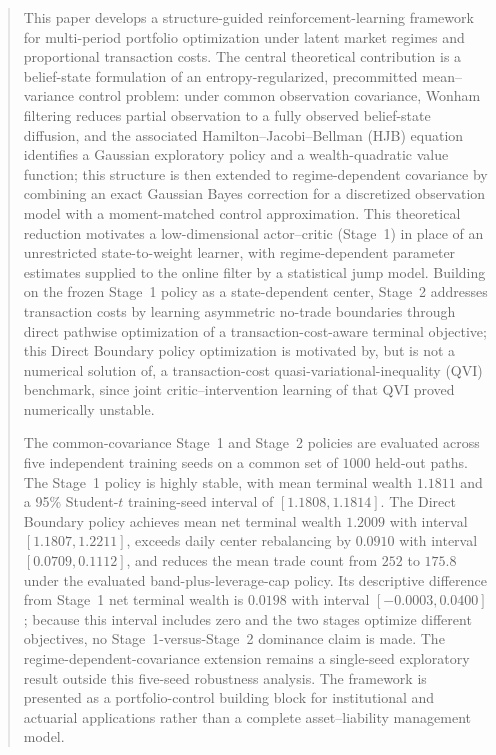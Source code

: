 \documentclass[a4paper,10pt]{article}
\begin{document}
\begin{abstract}
This paper develops a structure-guided reinforcement-learning framework for multi-period portfolio optimization under latent market regimes and proportional transaction costs. The central theoretical contribution is a belief-state formulation of an entropy-regularized, precommitted mean--variance control problem: under common observation covariance, Wonham filtering reduces partial observation to a fully observed belief-state diffusion, and the associated Hamilton--Jacobi--Bellman (HJB) equation identifies a Gaussian exploratory policy and a wealth-quadratic value function; this structure is then extended to regime-dependent covariance by combining an exact Gaussian Bayes correction for a discretized observation model with a moment-matched control approximation. This theoretical reduction motivates a low-dimensional actor--critic (Stage~1) in place of an unrestricted state-to-weight learner, with regime-dependent parameter estimates supplied to the online filter by a statistical jump model. Building on the frozen Stage~1 policy as a state-dependent center, Stage~2 addresses transaction costs by learning asymmetric no-trade boundaries through direct pathwise optimization of a transaction-cost-aware terminal objective; this Direct Boundary policy optimization is motivated by, but is not a numerical solution of, a transaction-cost quasi-variational-inequality (QVI) benchmark, since joint critic--intervention learning of that QVI proved numerically unstable.

The common-covariance Stage~1 and Stage~2 policies are evaluated across five independent training seeds on a common set of $1000$ held-out paths. The Stage~1 policy is highly stable, with mean terminal wealth $1.1811$ and a 95\% Student-$t$ training-seed interval of $[1.1808,1.1814]$. The Direct Boundary policy achieves mean net terminal wealth $1.2009$ with interval $[1.1807,1.2211]$, exceeds daily center rebalancing by $0.0910$ with interval $[0.0709,0.1112]$, and reduces the mean trade count from $252$ to $175.8$ under the evaluated band-plus-leverage-cap policy. Its descriptive difference from Stage~1 net terminal wealth is $0.0198$ with interval $[-0.0003,0.0400]$; because this interval includes zero and the two stages optimize different objectives, no Stage~1-versus-Stage~2 dominance claim is made. The regime-dependent-covariance extension remains a single-seed exploratory result outside this five-seed robustness analysis. The framework is presented as a portfolio-control building block for institutional and actuarial applications rather than a complete asset--liability management model.
\end{abstract}
\end{document}
